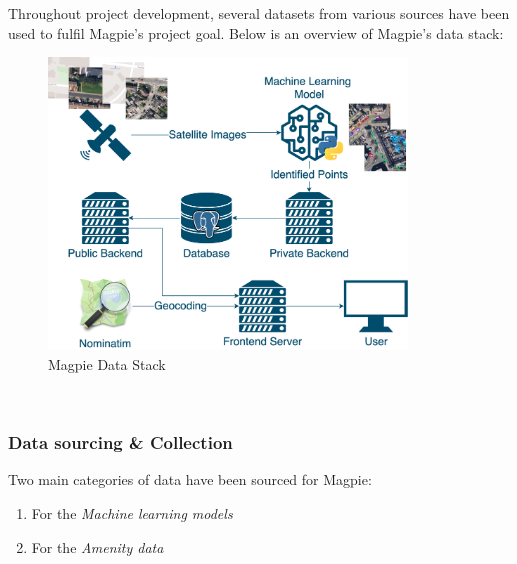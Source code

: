 Throughout project development, several datasets from various sources have been used to fulfil Magpie's project goal. Below is an overview of Magpie's data stack:
\begin{figure}[h!]
    \centering
    \includegraphics[width=0.85\textwidth]{images/magpie-data-stack.png}
    \caption{Magpie Data Stack}
\end{figure}\\

\subsubsection{Data sourcing \& Collection}
Two main categories of data have been sourced for Magpie:
\begin{enumerate}
    \item For the \emph{Machine learning models}
    \item For the \emph{Amenity data}
\end{enumerate}

